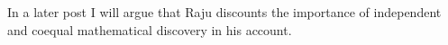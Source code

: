 In a later post I will argue that Raju discounts the importance of
independent and coequal mathematical discovery in his account.



